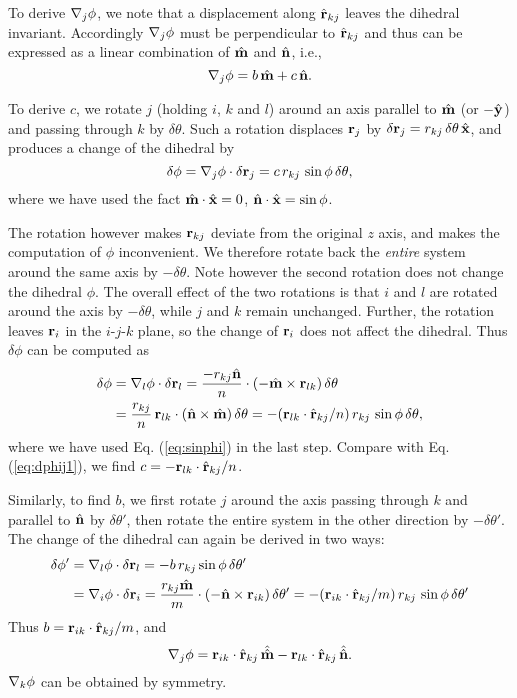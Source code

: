 \documentclass{article}
\begin{document}
To derive $\nabla_j \phi$, we note that a displacement along $\hat{\mathbf{r}}_{kj}$
leaves the dihedral invariant.
Accordingly $\nabla_j \phi$ must be perpendicular to $\hat{\mathbf{r}}_{kj}$
and thus can be expressed as a linear combination of $\hat{\mathbf{m}}$ and $\hat{\mathbf{n}}$, i.e.,
\[
\nabla_j \phi = b \, \hat{\mathbf{m}} + c \, \hat{\mathbf{n}}.
\]

To derive $c$, we rotate $j$ (holding $i$, $k$ and $l$) around
an axis parallel to $\hat{\mathbf{m}}$ (or $-\hat{\mathbf{y}}$) and passing through $k$ by $\delta \theta$.
Such a rotation displaces $\mathbf{r}_j$ by
%
$\delta \mathbf{r}_j = r_{kj} \, \delta \theta \, \hat{\mathbf{x}}$,
%
and produces a change of the dihedral by
\begin{equation}
\delta \phi
  = \nabla_j \phi \cdot \delta \mathbf{r}_j
  = c \, r_{kj} \, \sin \phi \, \delta \theta,
\label{eq:dphij1}
\end{equation}
where we have used the fact $\hat{\mathbf{m}} \cdot \hat{\mathbf{x}} = 0$, $\hat{\mathbf{n}} \cdot \hat{\mathbf{x}} = \sin \phi$.


The rotation however makes $\mathbf{r}_{kj}$ deviate from the original $z$ axis,
  and makes the computation of $\phi$ inconvenient.
We therefore rotate back the \emph{entire} system around the same axis by $-\delta \theta$.
Note however the second rotation does not change the dihedral $\phi$.
The overall effect of the two rotations is that
  $i$ and $l$ are rotated around the axis by $-\delta \theta$,
   while $j$ and $k$ remain unchanged.
%
%
Further, the rotation leaves $\mathbf{r}_i$ in the $i$-$j$-$k$ plane,
so the change of $\mathbf{r}_i$ does not affect the dihedral.
%
Thus $\delta \phi$ can be computed as
\begin{equation*}
\begin{split}
\delta \phi
  &= \nabla_l \phi \cdot \delta \mathbf{r}_l =
 \frac{-r_{kj} \hat{\mathbf{n}}}{n} \cdot (-\hat{\mathbf{m}} \times \mathbf{r}_{lk}) \, \delta \theta  \\
  &= \frac{r_{kj}}{n} \, \mathbf{r}_{lk} \cdot (\hat{\mathbf{n}} \times \hat{\mathbf{m}}) \, \delta \theta
  = -(\mathbf{r}_{lk} \cdot \hat{\mathbf{r}}_{kj} / n )\, r_{kj} \, \sin \phi \, \delta \theta,
\end{split}
\end{equation*}
%
where we have used Eq. (\ref{eq:sinphi}) in the last step.
%
Compare with Eq. (\ref{eq:dphij1}), we find $c=-\mathbf{r}_{lk}\cdot\hat{\mathbf{r}}_{kj}/n$.


Similarly, to find $b$, we first rotate $j$ around the axis passing through $k$
and parallel to $\hat{\mathbf{n}}$ by $\delta \theta'$,
then rotate the entire system in the other direction by $-\delta \theta'$.
%
The change of the dihedral can again be derived in two ways:
\begin{equation*}
\begin{split}
\delta \phi'
  & = \nabla_l \phi \cdot \delta \mathbf{r}_l = -b \, r_{kj} \sin \phi \, \delta \theta' \\
  & = \nabla_i \phi \cdot \delta \mathbf{r}_i
    = \frac{r_{kj} \hat{\mathbf{m}}} {m} \cdot (-\hat{\mathbf{n}} \times \mathbf{r}_{ik}) \, \delta \theta'
    = - (\mathbf{r}_{ik} \cdot \hat{\mathbf{r}}_{kj}/m) \, r_{k j} \,  \sin \phi \,  \delta \theta'
\end{split}
\end{equation*}
Thus $b = \mathbf{r}_{ik} \cdot \hat{\mathbf{r}}_{kj}/m$, and
%
\[
  \nabla_j \phi = \mathbf{r}_{ik} \cdot \hat{\mathbf{r}}_{kj} \, \hat{\hat{\mathbf{m}}} - \mathbf{r}_{lk}\cdot \hat{\mathbf{r}}_{kj} \, \hat{\hat{\mathbf{n}}}.
\]
$\nabla_k \phi$ can be obtained by symmetry.
\end{document}
